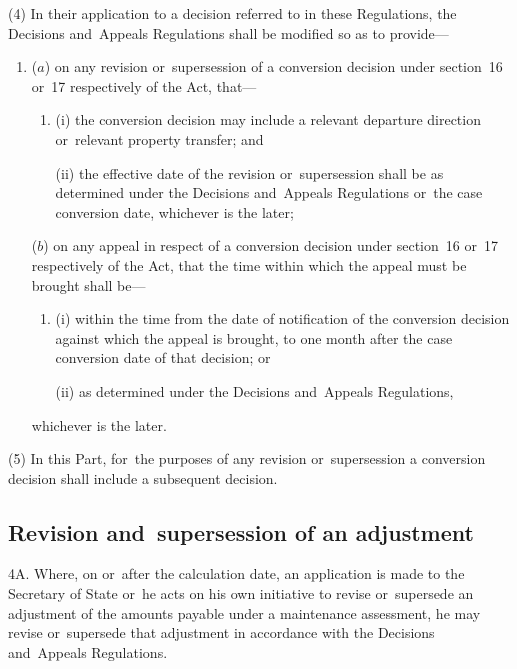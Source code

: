 \documentclass[12pt,a4paper]{article}
\begin{document}
(4) In their application to a decision referred to in these Regulations, the Decisions and~Appeals Regulations shall be modified so as to provide—
\begin{enumerate}\item[]
($a$) on any revision or~supersession of a conversion decision under section~16 or~17 respectively of the Act, that—
\begin{enumerate}\item[]
(i) the conversion decision may include a relevant departure direction or~relevant property transfer; and

(ii) the effective date of the revision or~supersession shall be as determined under the Decisions and~Appeals Regulations or~the case conversion date, whichever is the later;
\end{enumerate}

($b$) on any appeal in respect of a conversion decision under section~16 or~17 respectively of the Act, that the time within which the appeal must be brought shall be—
\begin{enumerate}\item[]
(i) within the time from the date of notification of the conversion decision against which the appeal is brought, to one month after the case conversion date of that decision; or

(ii) as determined under the Decisions and~Appeals Regulations,
\end{enumerate}
whichever is the later.
\end{enumerate}

(5) In this Part, for~the purposes of any revision or~supersession a conversion decision shall include a subsequent decision.


\subsection[4A. Revision and~supersession of an adjustment]{Revision and~supersession of an adjustment}

4A.  Where, on or~after the calculation date, an application is made to the Secretary of State or~he acts on his own initiative to revise or~supersede an adjustment of the amounts payable under a maintenance assessment, he may revise or~supersede that adjustment in accordance with the Decisions and~Appeals Regulations.
\end{document}
